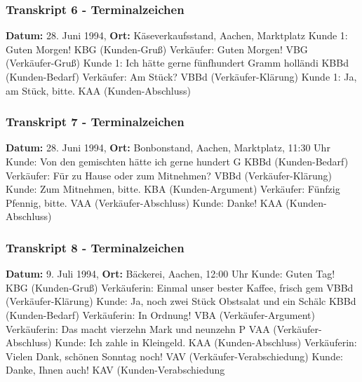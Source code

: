 \documentclass[
]{article}
\begin{document}
\subsubsection{\texorpdfstring{\textbf{Transkript 6 -
Terminalzeichen}}{Transkript 6 - Terminalzeichen}}\label{transkript-6---terminalzeichen}

\textbf{Datum:} 28. Juni 1994, \textbf{Ort:} Käseverkaufsstand, Aachen,
Marktplatz\textbar{} Kunde 1: Guten Morgen! \textbar{} KBG (Kunden-Gruß)
\textbar{} Verkäufer: Guten Morgen! \textbar{} VBG (Verkäufer-Gruß)
\textbar{} Kunde 1: Ich hätte gerne fünfhundert Gramm holländi\textbar{}
KBBd (Kunden-Bedarf) \textbar{} Verkäufer: Am Stück? \textbar{} VBBd
(Verkäufer-Klärung) \textbar{} Kunde 1: Ja, am Stück, bitte. \textbar{}
KAA (Kunden-Abschluss)

\subsubsection{\texorpdfstring{\textbf{Transkript 7 -
Terminalzeichen}}{Transkript 7 - Terminalzeichen}}\label{transkript-7---terminalzeichen}

\textbf{Datum:} 28. Juni 1994, \textbf{Ort:} Bonbonstand, Aachen,
Marktplatz, 11:30 Uhr\textbar{} Kunde: Von den gemischten hätte ich
gerne hundert G\textbar{} KBBd (Kunden-Bedarf) \textbar{} Verkäufer: Für
zu Hause oder zum Mitnehmen? \textbar{} VBBd (Verkäufer-Klärung)
\textbar{} Kunde: Zum Mitnehmen, bitte. \textbar{} KBA (Kunden-Argument)
\textbar{} Verkäufer: Fünfzig Pfennig, bitte. \textbar{} VAA
(Verkäufer-Abschluss) \textbar{} Kunde: Danke! \textbar{} KAA
(Kunden-Abschluss)

\subsubsection{\texorpdfstring{\textbf{Transkript 8 -
Terminalzeichen}}{Transkript 8 - Terminalzeichen}}\label{transkript-8---terminalzeichen}

\textbf{Datum:} 9. Juli 1994, \textbf{Ort:} Bäckerei, Aachen, 12:00
Uhr\textbar{} Kunde: Guten Tag! \textbar{} KBG (Kunden-Gruß) \textbar{}
Verkäuferin: Einmal unser bester Kaffee, frisch gem\textbar{} VBBd
(Verkäufer-Klärung) \textbar{} Kunde: Ja, noch zwei Stück Obstsalat und
ein Schälc\textbar{} KBBd (Kunden-Bedarf) \textbar{} Verkäuferin: In
Ordnung! \textbar{} VBA (Verkäufer-Argument) \textbar{} Verkäuferin: Das
macht vierzehn Mark und neunzehn P\textbar{} VAA (Verkäufer-Abschluss)
\textbar{} Kunde: Ich zahle in Kleingeld. \textbar{} KAA
(Kunden-Abschluss) \textbar{} Verkäuferin: Vielen Dank, schönen Sonntag
noch! \textbar{} VAV (Verkäufer-Verabschiedung) \textbar{} Kunde: Danke,
Ihnen auch! \textbar{} KAV (Kunden-Verabschiedung
\end{document}
